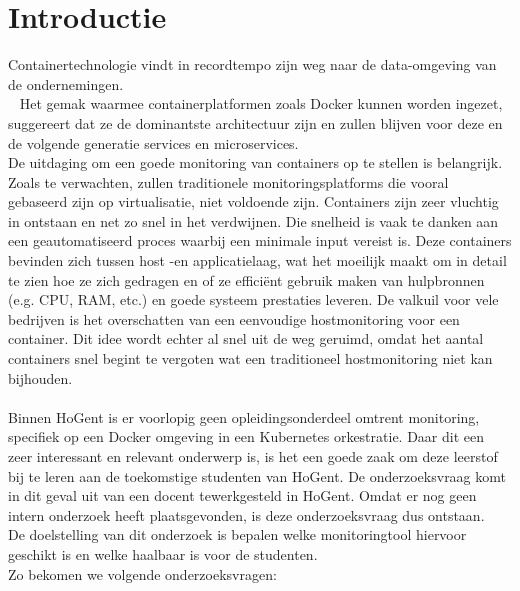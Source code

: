 
\section{Introductie} %
\label{sec:introductie}
Containertechnologie vindt in recordtempo zijn weg naar de data-omgeving van de ondernemingen.\\~\autocite{Cole2016} Het gemak waarmee containerplatformen zoals Docker kunnen worden ingezet, suggereert dat ze de dominantste architectuur zijn en zullen blijven voor deze en de volgende generatie services en microservices.
\\
De uitdaging om een goede monitoring van containers op te stellen is belangrijk. Zoals te verwachten, zullen traditionele monitoringsplatforms die vooral gebaseerd zijn op virtualisatie, niet voldoende zijn. Containers zijn zeer vluchtig in ontstaan en net zo snel in het verdwijnen. Die snelheid is vaak te danken aan een geautomatiseerd proces waarbij een minimale input vereist is. Deze containers bevinden zich tussen host -en applicatielaag, wat het moeilijk maakt om in detail te zien hoe ze zich gedragen en of ze efficiënt gebruik maken van hulpbronnen (e.g. CPU, RAM, etc.) en goede systeem prestaties leveren. De valkuil voor vele bedrijven is het overschatten van een eenvoudige hostmonitoring voor een container. Dit idee wordt echter al snel uit de weg geruimd, omdat het aantal containers snel begint te vergoten wat een traditioneel hostmonitoring niet kan bijhouden.
\\
\\
Binnen HoGent is er voorlopig geen opleidingsonderdeel omtrent monitoring, specifiek op een Docker omgeving in een Kubernetes orkestratie. Daar dit een zeer interessant en relevant onderwerp is, is het een goede zaak om deze leerstof bij te leren aan de toekomstige studenten van HoGent. De onderzoeksvraag komt in dit geval uit van een docent tewerkgesteld in HoGent. Omdat er nog geen intern onderzoek heeft plaatsgevonden, is deze onderzoeksvraag dus ontstaan. 
\\
De doelstelling van dit onderzoek is bepalen welke monitoringtool hiervoor geschikt is en welke haalbaar is voor de studenten. 
\\
Zo bekomen we volgende onderzoeksvragen:

